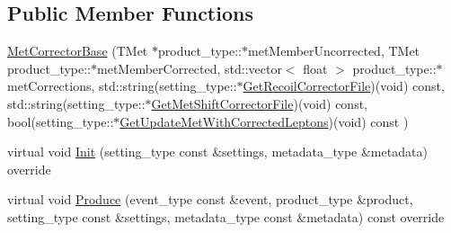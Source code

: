 \subsection*{Public Member Functions}
\begin{DoxyCompactItemize}
\item 
\hyperlink{classMetCorrectorBase_aa81947e3ed5338e560a872c4496cfb05}{MetCorrectorBase} (TMet $\ast$product\_\-type::$\ast$metMemberUncorrected, TMet product\_\-type::$\ast$metMemberCorrected, std::vector$<$ float $>$ product\_\-type::$\ast$metCorrections, std::string(setting\_\-type::$\ast$\hyperlink{classMetCorrectorBase_ab75acb883f87b203f02497a8ac1d9612}{GetRecoilCorrectorFile})(void) const, std::string(setting\_\-type::$\ast$\hyperlink{classMetCorrectorBase_ae8439b8b315c598df5771d88cd245a49}{GetMetShiftCorrectorFile})(void) const, bool(setting\_\-type::$\ast$\hyperlink{classMetCorrectorBase_a9ee54f0240f3285b68a6a8290618cfad}{GetUpdateMetWithCorrectedLeptons})(void) const )
\item 
virtual void \hyperlink{classMetCorrectorBase_a16b625ee626c0cead5c6c4d65ac180e4}{Init} (setting\_\-type const \&settings, metadata\_\-type \&metadata) override
\item 
virtual void \hyperlink{classMetCorrectorBase_a06f1a4a2b3884caa0a01ef47654e3040}{Produce} (event\_\-type const \&event, product\_\-type \&product, setting\_\-type const \&settings, metadata\_\-type const \&metadata) const override
\end{DoxyCompactItemize}
